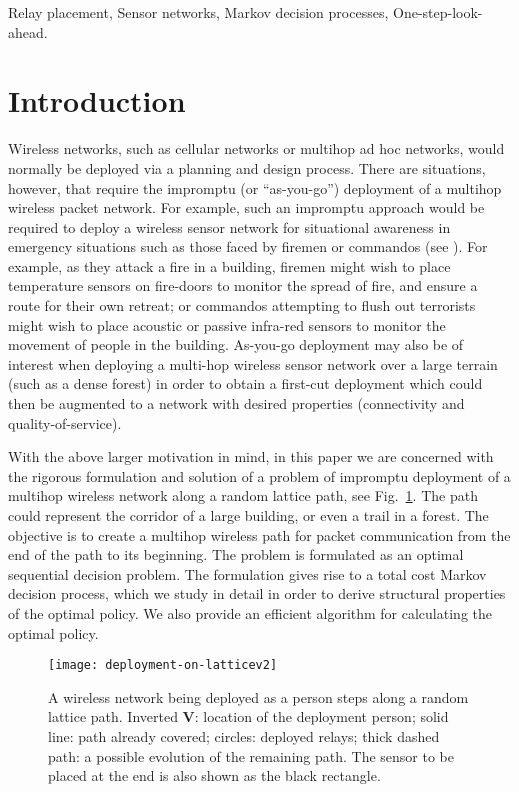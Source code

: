 \documentclass[conference]{IEEEtran}
\begin{document}
\begin{keywords}
Relay placement, Sensor networks, Markov decision processes, One-step-look-ahead.
\end{keywords}


\section{Introduction} \label{intro} Wireless networks, such as
cellular networks or multihop ad hoc networks, would normally be
deployed via a planning and design process. There are situations,
however, that require the impromptu (or ``as-you-go'') deployment of a
multihop wireless packet network. For example, such an impromptu
approach would be required to deploy a wireless sensor network for
situational awareness in emergency situations such as those faced by
firemen or commandos (see
\cite{Fischer,howard-etal02incremental-self-deployment-algorithm}). For
example, as they attack a fire in a building, firemen might wish to
place temperature sensors on fire-doors to monitor the spread of fire,
and ensure a route for their own retreat; or commandos attempting to
flush out terrorists might wish to place acoustic or passive infra-red
sensors to monitor the movement of people in the building. As-you-go
deployment may also be of interest when deploying a multi-hop wireless
sensor network over a large terrain (such as a dense forest) in order
to obtain a first-cut deployment which could then be augmented to a
network with desired properties (connectivity and quality-of-service).

With the above larger motivation in mind, in this paper we are
concerned with the rigorous formulation and solution of a problem of
impromptu deployment of a multihop wireless network along a random
lattice path, see Fig.~\ref{impromptu_figure}. The path could
represent the corridor of a large building, or even a trail in a
forest. The objective is to create a multihop wireless path for packet
communication from the end of the path to its beginning. The problem
is formulated as an optimal sequential decision problem. The
formulation gives rise to a total cost Markov decision process, which
we study in detail in order to derive structural properties of the
optimal policy. We also provide an efficient algorithm for calculating
the optimal policy.

\begin{figure}[t]
\centering
\texttt{[image: deployment-on-latticev2]}
\caption{\label{impromptu_figure} A wireless network being deployed as
  a person steps along a random lattice path. Inverted \textbf{V}:
  location of the deployment person; solid line: path already covered;
  circles: deployed relays; thick dashed path: a possible evolution of
  the remaining path. The sensor to be placed at the end is
  also shown as the black rectangle.}
\vspace{-6mm}
\end{figure}
\end{document}
